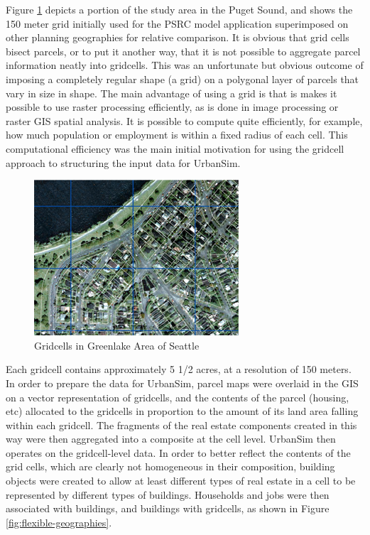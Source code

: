Figure \ref{fig:gridcells} depicts a portion of the study area in the Puget Sound, and shows the 150 meter grid initially used for the PSRC model application
superimposed on other planning geographies for relative comparison.  It is obvious that grid cells bisect parcels, or to put it another way, that it is not possible to aggregate parcel information neatly into gridcells.  This was an unfortunate but obvious outcome of imposing a completely regular shape (a grid) on a polygonal layer of parcels that vary in size in shape.  The main advantage of using a grid is that is makes it possible
to use raster processing efficiently, as is done in image processing or raster GIS spatial analysis.  It is possible to compute quite efficiently, for example, how much population or employment is within a fixed radius of each cell.  This computational efficiency was the main initial motivation for using the gridcell approach to structuring the input data for UrbanSim.

\begin{figure}[htp]
\begin{center}
\includegraphics[scale=1.25]{graphics/gridmap-small.png}
\end{center}
\caption{Gridcells in Greenlake Area of Seattle}
\label{fig:gridcells}
\end{figure}

Each gridcell contains approximately 5 1/2 acres, at a resolution of 150 meters.  In order to prepare the data for UrbanSim, parcel maps were overlaid in the GIS on a vector representation of gridcells, and the contents of the parcel (housing, etc)  allocated to the gridcells in proportion to the amount of its land area falling within each gridcell.  The fragments of the real estate components created in this way were then aggregated into a composite at the cell level.  UrbanSim then operates on the gridcell-level data.  In order to better reflect the contents of the grid cells, which are clearly not homogeneous in their composition, building objects were created to allow at least different types of real estate in a cell to be represented by different types of buildings.  Households and jobs were then associated with buildings, and buildings with gridcells, as shown in Figure \ref{fig:flexible-geographies}.

